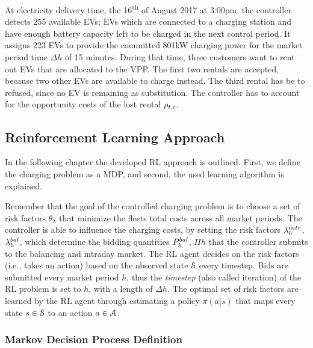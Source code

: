 \documentclass[a4paper, 12pt]{article}
\begin{document}
At electricity delivery time, the 16\textsuperscript{th} of August 2017 at 3:00pm, the
controller detects 255 available EVs; EVs which are connected to a charging
station and have enough battery capacity left to be charged in the next control
period. It assigns 223 EVs to provide the committed 801kW charging power for the
market period time \(\Delta h\) of 15 minutes. During that time, three customers
want to rent out EVs that are allocated to the VPP. The first two rentals are
accepted, because two other EVs are available to charge instead. The third
rental has be to refused, since no EV is remaining as substitution. The
controller has to account for the opportunity costs of the lost rental
\(\oc\).
\subsection{Reinforcement Learning Approach \label{sec-model-rl}}
\label{sec:org2b924ea}
In the following chapter the developed RL approach is outlined. First, we define
the charging problem as a MDP, and second, the used learning algorithm is
explained.

Remember that the goal of the controlled charging problem is to choose a set of
risk factors \(\theta_{\lambda}\) that minimize the fleets total costs across all
market periods. The controller is able to influence the charging costs, by
setting the risk factors \(\li{h}\), \(\lb{h}\), which determine the bidding
quantities \(\Pb{h}\), \(\Pi{h}\) that the controller submits to the balancing and
intraday market. The RL agent decides on the risk factors (i.e., takes an
action) based on the observed state \(\S\) every timestep. Bids are submitted
every market period \(h\), thus the \emph{timestep} (also called iteration) of the RL
problem is set to \(h\), with a length of \(\Delta{h}\). The optimal set of risk
factors are learned by the RL agent through estimating a policy \(\pi(a|s)\) that
maps every state \(s\in\S\) to an action \(a\in\A\).
\subsubsection{Markov Decision Process Definition}
\label{sec:org0608427}
\end{document}
